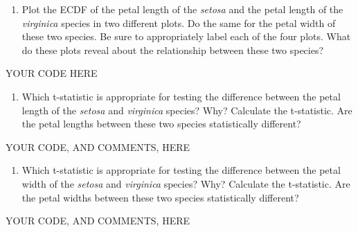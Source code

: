 \documentclass[
]{article}
\newenvironment{Shaded}{\begin{snugshade}}{\end{snugshade}}
\newcommand{\NormalTok}[1]{#1}
\providecommand{\tightlist}{%
  \setlength{\itemsep}{0pt}\setlength{\parskip}{0pt}}
\begin{document}
\begin{enumerate}
\def\labelenumi{\arabic{enumi}.}
\setcounter{enumi}{3}
\tightlist
\item
  Plot the ECDF of the petal length of the \emph{setosa} and the petal
  length of the \emph{virginica} species in two different plots. Do the
  same for the petal width of these two species. Be sure to
  appropriately label each of the four plots. What do these plots reveal
  about the relationship between these two species?
\end{enumerate}

\begin{Shaded}
\begin{Highlighting}[]
\NormalTok{YOUR CODE HERE}
\end{Highlighting}
\end{Shaded}

\begin{enumerate}
\def\labelenumi{\arabic{enumi}.}
\setcounter{enumi}{4}
\tightlist
\item
  Which t-statistic is appropriate for testing the difference between
  the petal length of the \emph{setosa} and \emph{virginica} species?
  Why? Calculate the t-statistic. Are the petal lengths between these
  two species statistically different?
\end{enumerate}

\begin{Shaded}
\begin{Highlighting}[]
\NormalTok{YOUR CODE, AND COMMENTS, HERE}
\end{Highlighting}
\end{Shaded}

\begin{enumerate}
\def\labelenumi{\arabic{enumi}.}
\setcounter{enumi}{5}
\tightlist
\item
  Which t-statistic is appropriate for testing the difference between
  the petal width of the \emph{setosa} and \emph{virginica} species?
  Why? Calculate the t-statistic. Are the petal widths between these two
  species statistically different?
\end{enumerate}

\begin{Shaded}
\begin{Highlighting}[]
\NormalTok{YOUR CODE, AND COMMENTS, HERE}
\end{Highlighting}
\end{Shaded}
\end{document}
